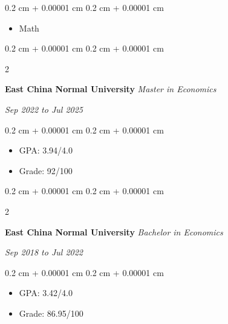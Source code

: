 \documentclass[10pt, letterpaper]{article}
\newenvironment{highlights}{
    \begin{itemize}[
        topsep=0.10 cm,
        parsep=0.10 cm,
        partopsep=0pt,
        itemsep=0pt,
        leftmargin=0.4 cm + 10pt
    ]
}{
    \end{itemize}
} %
\newenvironment{onecolentry}{
    \begin{adjustwidth}{
        0.2 cm + 0.00001 cm
    }{
        0.2 cm + 0.00001 cm
    }
}{
    \end{adjustwidth}
} %
\newenvironment{twocolentry}[2][]{
    \onecolentry
    \def\secondColumn{#2}
    \setcolumnwidth{\fill, 4.5 cm}
    \begin{paracol}{2}
}{
    \switchcolumn \raggedleft \secondColumn
    \end{paracol}
    \endonecolentry
} %
\newenvironment{paper}{\vspace{.2cm}\begin{samepage}\begin{onecolentry}}{\end{onecolentry}\end{samepage}\vspace{0.2cm}}
\begin{document}
\vspace{0.10 cm}

\begin{onecolentry}
	\begin{highlights}
				\item Math
	\end{highlights}
\end{onecolentry}

\vspace{0.20 cm}

\begin{twocolentry}{
		\textit{Sep 2022 to Jul 2025}}
	\textbf{East China Normal University}
	\textit{Master in Economics}
\end{twocolentry}

\vspace{0.10 cm}

\begin{onecolentry}
	\begin{highlights}
		\item GPA: 3.94/4.0
		\item Grade: 92/100
	\end{highlights}
\end{onecolentry}

\vspace{0.2 cm}

\begin{twocolentry}{
		\textit{Sep 2018 to Jul 2022}}
	\textbf{East China Normal University}
	\textit{Bachelor in Economics}
\end{twocolentry}

\vspace{0.10 cm}

\begin{onecolentry}
	\begin{highlights}
		\item GPA: 3.42/4.0
		\item Grade: 86.95/100
	\end{highlights}
\end{onecolentry}


%
%
%
\end{document}
